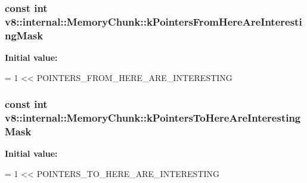 \subsubsection[{\texorpdfstring{k\+Pointers\+From\+Here\+Are\+Interesting\+Mask}{kPointersFromHereAreInterestingMask}}]{\setlength{\rightskip}{0pt plus 5cm}const int v8\+::internal\+::\+Memory\+Chunk\+::k\+Pointers\+From\+Here\+Are\+Interesting\+Mask\hspace{0.3cm}{\ttfamily [static]}}\hypertarget{classv8_1_1internal_1_1_memory_chunk_a095d7d0bdc2f42edd3615fb0367df1a5}{}\label{classv8_1_1internal_1_1_memory_chunk_a095d7d0bdc2f42edd3615fb0367df1a5}
{\bfseries Initial value\+:}
\begin{DoxyCode}
=
      1 << POINTERS\_FROM\_HERE\_ARE\_INTERESTING
\end{DoxyCode}
\subsubsection[{\texorpdfstring{k\+Pointers\+To\+Here\+Are\+Interesting\+Mask}{kPointersToHereAreInterestingMask}}]{\setlength{\rightskip}{0pt plus 5cm}const int v8\+::internal\+::\+Memory\+Chunk\+::k\+Pointers\+To\+Here\+Are\+Interesting\+Mask\hspace{0.3cm}{\ttfamily [static]}}\hypertarget{classv8_1_1internal_1_1_memory_chunk_ab722b79056ded5db4f9444e40ce4e38d}{}\label{classv8_1_1internal_1_1_memory_chunk_ab722b79056ded5db4f9444e40ce4e38d}
{\bfseries Initial value\+:}
\begin{DoxyCode}
=
      1 << POINTERS\_TO\_HERE\_ARE\_INTERESTING
\end{DoxyCode}
